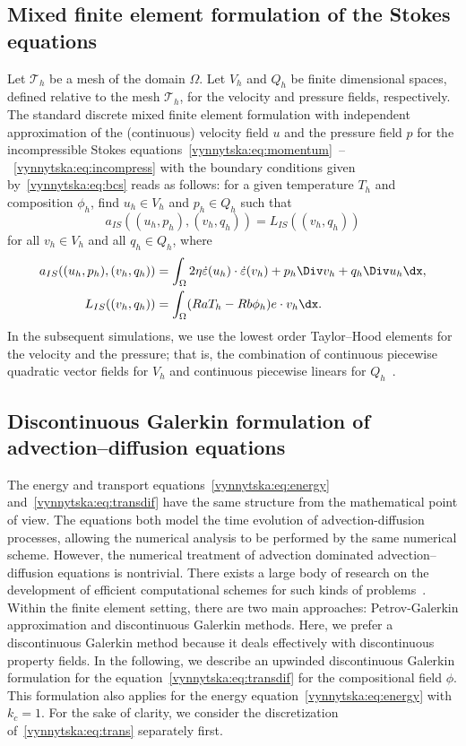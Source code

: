 \subsection{Mixed finite element formulation of the Stokes equations}

Let $\mathcal{T}_h$ be a mesh of the domain $\Omega$. Let $V_h$ and
$Q_h$ be finite dimensional spaces, defined relative to the mesh
$\mathcal{T}_h$, for the velocity and pressure fields,
respectively. The standard discrete mixed finite element formulation
with independent approximation of the (continuous) velocity field $u$
and the pressure field $p$ for the incompressible Stokes
equations~\eqref{vynnytska:eq:momentum}~--~\eqref{vynnytska:eq:incompress}
with the boundary conditions given by~\eqref{vynnytska:eq:bcs} reads
as follows: for a given temperature $T_h$ and composition $\phi_h$,
find $u_h \in V_h$ and $p_h \in Q_h$ such that
\begin{equation}
  \label{vynnytska:eq:mixed}
  a_{IS} ( (u_h, p_h), (v_h, q_h) ) = L_{IS} ( (v_h, q_h) )
\end{equation}
for all $v_h \in V_h$ and all $q_h \in Q_h$, where
\begin{align}
  a_{IS} ( (u_h, p_h), (v_h, q_h) )
  & =
  \int_{\Omega} 2 \eta \dot {\varepsilon}(u_h)  \cdot \dot {\varepsilon}(v_h)
  + p_h \Div v_h + q_h \Div u_h \dx, \\
  L_{IS} ( (v_h, q_h) ) &=
  \int_{\Omega} ( Ra T_h - Rb \phi_{h} ) e \cdot v_h  \dx.
\end{align}
In the subsequent simulations, we use the lowest order Taylor--Hood
elements for the velocity and the pressure; that is, the combination
of continuous piecewise quadratic vector fields for $V_h$ and
continuous piecewise linears for $Q_h$~\citep{TaylorHood1973}.

\subsection{Discontinuous Galerkin formulation of advection--diffusion equations}

The energy and transport equations~\eqref{vynnytska:eq:energy}
and~\eqref{vynnytska:eq:transdif} have the same structure from the
mathematical point of view. The equations both model the time
evolution of advection-diffusion processes, allowing the numerical
analysis to be performed by the same numerical scheme. However, the
numerical treatment of advection dominated advection--diffusion
equations is nontrivial. There exists a large body of research on the
development of efficient computational schemes for such kinds of
problems~\citep{Lin2006, ZienkiewiczTaylor2000}.  Within the finite
element setting, there are two main approaches: Petrov-Galerkin
approximation and discontinuous Galerkin methods. Here, we prefer a
discontinuous Galerkin method because it deals effectively with
discontinuous property fields. In the following, we describe an
upwinded discontinuous Galerkin formulation for the
equation~\eqref{vynnytska:eq:transdif} for the compositional field
$\phi$. This formulation also applies for the energy
equation~\eqref{vynnytska:eq:energy} with $k_c = 1$. For the sake of
clarity, we consider the discretization of~\eqref{vynnytska:eq:trans}
separately first.

